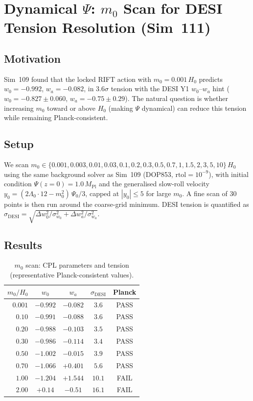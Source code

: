 \documentclass[12pt,a4paper]{article}
\begin{document}
\section{Dynamical $\Psi$: $m_0$ Scan for DESI Tension Resolution (Sim~111)}
\label{sec:sim111}

\subsection{Motivation}

Sim~109 found that the locked RIFT action with $m_0=0.001\,H_0$ predicts
$w_0=-0.992$, $w_a=-0.082$, in 3.6$\sigma$ tension with the DESI Y1
$w_0$--$w_a$ hint ($w_0=-0.827\pm0.060$, $w_a=-0.75\pm0.29$).
The natural question is whether increasing $m_0$ toward or above $H_0$
(making $\Psi$ dynamical) can reduce this tension while remaining Planck-consistent.

\subsection{Setup}

We scan $m_0\in\{0.001,0.003,0.01,0.03,0.1,0.2,0.3,0.5,0.7,1,1.5,2,3,5,10\}\,H_0$
using the same background solver as Sim~109 (DOP853, $\mathrm{rtol}=10^{-9}$),
with initial condition $\Psi(z=0)=1.0\,M_\mathrm{Pl}$ and the generalised
slow-roll velocity $y_0 = (2\Lambda_0\cdot12 - m_0^2)\,\Psi_0/3$, capped at $|y_0|\leq5$
for large $m_0$.  A fine scan of 30 points is then run around the coarse-grid minimum.
DESI tension is quantified as $\sigma_\mathrm{DESI}=\sqrt{\Delta w_0^2/\sigma_{w_0}^2+\Delta w_a^2/\sigma_{w_a}^2}$.

\subsection{Results}

\begin{table}[h]
\centering
\caption{$m_0$ scan: CPL parameters and tension (representative Planck-consistent values).}
\begin{tabular}{rcccc}
\hline
$m_0/H_0$ & $w_0$ & $w_a$ & $\sigma_\mathrm{DESI}$ & Planck \\
\hline
$0.001$ & $-0.992$ & $-0.082$ & $3.6$ & PASS \\
$0.10$  & $-0.991$ & $-0.088$ & $3.6$ & PASS \\
$0.20$  & $-0.988$ & $-0.103$ & $3.5$ & PASS \\
$0.30$  & $-0.986$ & $-0.114$ & $3.4$ & PASS \\
$0.50$  & $-1.002$ & $-0.015$ & $3.9$ & PASS \\
$0.70$  & $-1.066$ & $+0.401$ & $5.6$ & PASS \\
$1.00$  & $-1.204$ & $+1.544$ & $10.1$ & FAIL \\
$2.00$  & $+0.14$  & $-0.51$  & $16.1$ & FAIL \\
\hline
\end{tabular}
\label{tab:sim111}
\end{table}
\end{document}
